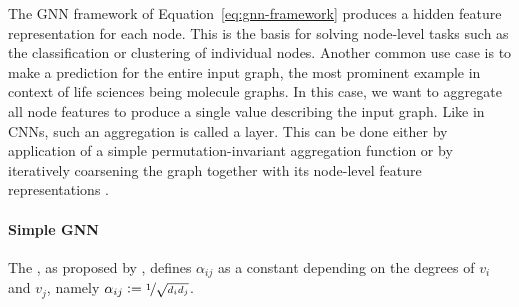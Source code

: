 \documentclass[
	fontsize=10pt, %
	twoside=false, %
	secnumdepth=1, %
  toc=indentunnumbered %
]{kaobook}
\begin{document}
The GNN framework of Equation~\ref{eq:gnn-framework} produces a hidden feature representation
for each node. This is the basis for solving node-level tasks such as the
classification or clustering of individual nodes. Another common use case is to
make a prediction for the entire input graph, the most prominent example in
context of life sciences being molecule graphs. In this case, we want to
aggregate all node features to produce a single value describing the input
graph. Like in CNNs, such an aggregation is called a  layer. This
can be done either by application of a simple permutation-invariant aggregation
function or by iteratively coarsening the graph together with its node-level
feature representations \cite{ying_hierarchical_2019}. 


\paragraph{Simple GNN} The , as
proposed by \citeauthor{kipf_semi-supervised_2017}
\cite{kipf_semi-supervised_2017}, defines $\alpha_{ij}$ as a constant depending
on the degrees of $v_i$ and $v_j$, namely $\alpha_{ij} := \nicefrac{1}{\sqrt{d_i
    d_j}}$.
\end{document}
